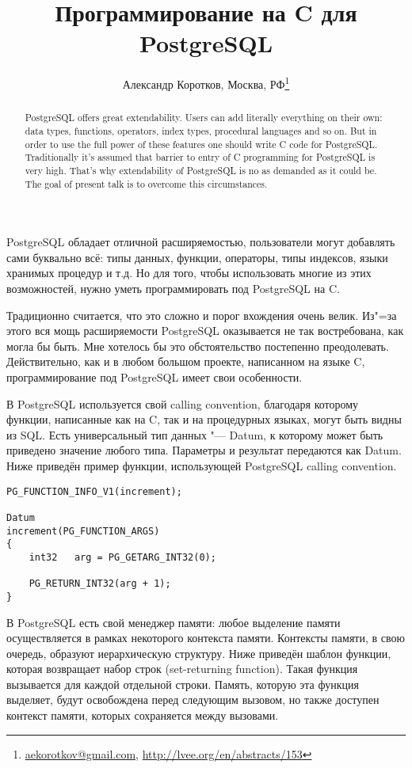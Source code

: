 \documentclass[10pt, a5paper]{article}
\begin{document}
\title{Программирование на C для PostgreSQL}
\author{Александр Коротков, Москва, РФ\footnote{\url{aekorotkov@gmail.com}, \url{http://lvee.org/en/abstracts/153}}}
\maketitle
\begin{abstract}
PostgreSQL offers great extendability. Users can add literally everything on their own: data types, functions, operators, index types, procedural languages and so on. But in order to use the full power of these features one should write C code for \linebreak PostgreSQL. Traditionally it's assumed that barrier to entry of C programming for PostgreSQL is very high. That's why extendability of PostgreSQL is no as demanded as it could be. The goal of present talk is to overcome this circumstances.
\end{abstract}
PostgreSQL обладает отличной расширяемостью, пользователи могут добавлять сами буквально всё: типы данных, функции, операторы, типы индексов, языки хранимых процедур и т.д. Но для того, чтобы использовать многие из этих возможностей, нужно уметь программировать под PostgreSQL на C.

Традиционно считается, что это сложно и порог вхождения \linebreak очень велик. Из"=за этого вся мощь расширяемости PostgreSQL оказывается не так востребована, как могла бы быть. Мне хотелось бы это обстоятельство постепенно преодолевать. Действительно, как и в любом большом проекте, написанном на языке C, программирование под PostgreSQL имеет свои особенности.

В PostgreSQL используется свой calling convention, благодаря которому функции, написанные как на C, так и на процедурных языках, могут быть видны из SQL. Есть универсальный тип данных "--- Datum, к которому может быть приведено значение любого типа. Параметры и результат передаются как Datum. Ниже приведён пример функции, использующей PostgreSQL calling convention.

\begin{verbatim}
PG_FUNCTION_INFO_V1(increment);

Datum
increment(PG_FUNCTION_ARGS)
{
    int32   arg = PG_GETARG_INT32(0);

    PG_RETURN_INT32(arg + 1);
}\end{verbatim}
В PostgreSQL есть свой менеджер памяти: любое выделение памяти осуществляется в рамках некоторого контекста памяти. Контексты памяти, в свою очередь, образуют иерархическую структуру. Ниже приведён шаблон функции, которая возвращает набор строк (set-returning function). Такая функция вызывается для каждой отдельной строки. Память, которую эта функция выделяет, будут освобождена перед следующим вызовом, но также доступен контекст памяти, которых сохраняется между вызовами.
\end{document}
